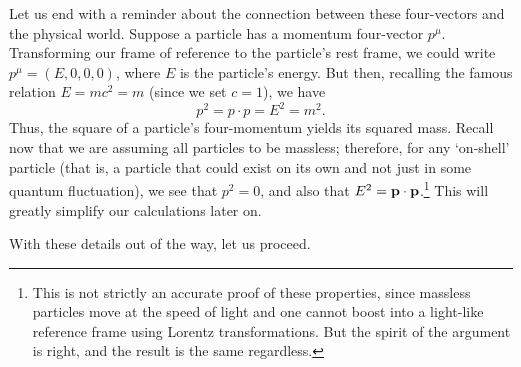 \documentclass[12pt,twoside,class=../reedthesis, crop=false]{standalone}
\begin{document}
	Let us end with a reminder about the connection between these four-vectors and the physical world. Suppose a particle has a momentum four-vector $p^\mu$. Transforming our frame of reference to the particle's rest frame, we could write $p^\mu = (E, 0, 0, 0)$, where $E$ is the particle's energy. But then, recalling the famous relation $E = mc^2 = m$ (since we set $c = 1$), we have
	\begin{equation}
		p^2 = p \cdot p = E^2 = m^2.
	\end{equation}
	Thus, the square of a particle's four-momentum yields its squared mass. Recall now that we are assuming all particles to be massless; therefore, for any `on-shell' particle (that is, a particle that could exist on its own and not just in some quantum fluctuation), we see that $p^2 = 0$, and also that $E^2 = \vb{p} \cdot \vb{p}$.\footnote{This is not strictly an accurate proof of these properties, since massless particles move at the speed of light and one cannot boost into a light-like reference frame using Lorentz transformations. But the spirit of the argument is right, and the result is the same regardless.} This will greatly simplify our calculations later on.

	With these details out of the way, let us proceed.

\ifstandalone
 

\fi
\end{document}
